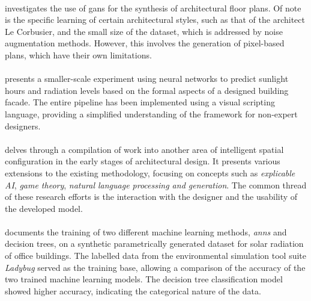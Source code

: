 \documentclass[a4paper, 12pt]{report}
\begin{document}
\paragraph{\cite{newton2019deep}} investigates the use of \acrshort{gans} for the synthesis of architectural floor plans. Of note is the specific learning of certain architectural styles, such as that of the architect Le Corbusier, and the small size of the dataset, which is addressed by noise augmentation methods. However, this involves the generation of pixel-based plans, which have their own limitations.

\paragraph{\cite{sebestyen2020machine}} presents a smaller-scale experiment using neural networks to predict sunlight hours and radiation levels based on the formal aspects of a designed building facade. The entire pipeline has been implemented using a visual scripting language, providing a simplified understanding of the framework for non-expert designers.

\paragraph{\cite{eisenstadt2020student}} delves through a compilation of work into another area of intelligent spatial configuration in the early stages of architectural design. It presents various extensions to the existing methodology, focusing on concepts such as \textit{explicable AI}, \textit{game theory}, \textit{natural language processing and generation}. The common thread of these research efforts is the interaction with the designer and the usability of the developed model.

\paragraph{\cite{alammar2021predicting}} documents the training of two different machine learning methods, \textit{\acrfull{anns}} and \glspl{decision tree}, on a synthetic parametrically generated dataset for solar radiation of office buildings. The labelled data from the environmental simulation tool suite \textit{Ladybug} served as the training base, allowing a comparison of the accuracy of the two trained machine learning models. The \gls{decision tree} classification model showed higher accuracy, indicating the categorical nature of the data.
\end{document}
